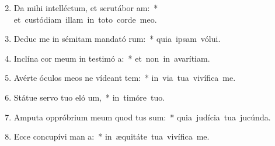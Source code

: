 \begin{flushleft}
\begin{enumerate}[leftmargin=*]
\setcounter{enumi}{1}

\item Da mihi intelléctum, et scrutábor  am:~* \mbox{et custódiam illam in toto corde meo.}
\item Deduc me in sémitam mandató rum:~* \mbox{quia ipsam vólui.}
\item Inclína cor meum in testimó a:~* \mbox{et non in avarítiam.}
\item Avérte óculos meos ne vídeant tem:~* \mbox{in via tua vivífica me.}
\item Státue servo tuo eló um,~* \mbox{in timóre tuo.}
\item Amputa oppróbrium meum quod tus sum:~* \mbox{quia judícia tua jucúnda.}
\item Ecce concupívi man a:~* \mbox{in æquitáte tua vivífica me.}



\end{enumerate}
\end{flushleft}

